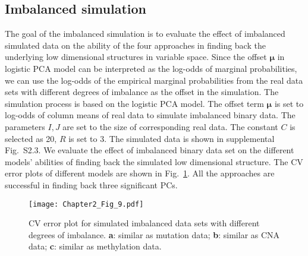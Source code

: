 \subsection{Imbalanced simulation}
The goal of the imbalanced simulation is to evaluate the effect of imbalanced simulated data on the ability of the four approaches in finding back the underlying low dimensional structures in variable space. Since the offset $\bm{\mu}$ in logistic PCA model can be interpreted as the log-odds of marginal probabilities, we can use the log-odds of the empirical marginal probabilities from the real data sets with different degrees of imbalance as the offset in the simulation. The simulation process is based on the logistic PCA model. The offset term $\bm{\mu}$ is set to log-odds of column means of real data to simulate imbalanced binary data. The parameters $I, J$ are set to the size of corresponding real data. The constant $C$ is selected as 20, $R$ is set to 3. The simulated data is shown in supplemental Fig.~S2.3. We evaluate the effect of imbalanced binary data set on the different models' abilities of finding back the simulated low dimensional structure. The CV error plots of different models are shown in Fig.~\ref{chapter2_fig:4}. All the approaches are successful in finding back three significant PCs.
\begin{figure}[htbp]
    \centering
    \texttt{[image: Chapter2\_Fig\_9.pdf]}
    \caption{CV error plot for simulated imbalanced data sets with different degrees of imbalance. \textbf{a}: similar as mutation data; \textbf{b}: similar as CNA data; \textbf{c}: similar as methylation data.}
    \label{chapter2_fig:4}
\end{figure}

